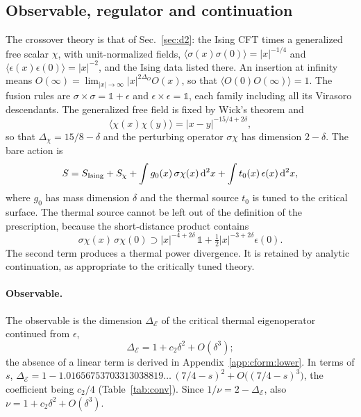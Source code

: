 \documentclass[11pt,a4paper]{article}
\numberwithin{equation}{section}
\newcommand{\dd}{\,\mathrm d}
\newcommand{\De}{\Delta_{\mathcal E}}
\begin{document}
\subsection{Observable, regulator and continuation}\label{app:cform:conv}
The crossover theory is that of Sec.~\ref{sec:d2}: the Ising CFT times a generalized free scalar $\chi$, with
unit-normalized fields, $\langle\sigma(x)\sigma(0)\rangle=|x|^{-1/4}$ and $\langle\epsilon(x)\epsilon(0)\rangle=|x|^{-2}$,
and the Ising data listed there. An insertion at infinity means
$O(\infty)=\lim_{|x|\to\infty}|x|^{2\Delta_O}O(x)$, so that $\langle O(0)O(\infty)\rangle=1$. The fusion rules are
$\sigma\times\sigma=\mathbb 1+\epsilon$ and $\epsilon\times\epsilon=\mathbb 1$, each family including all its Virasoro
descendants. The generalized free field is fixed by Wick's theorem and
\begin{equation}
 \langle\chi(x)\chi(y)\rangle=|x-y|^{-15/4+2\delta},
 \label{eq:cform:gff}
\end{equation}
so that $\Delta_\chi=15/8-\delta$ and the perturbing operator $\sigma\chi$ has dimension $2-\delta$. The bare action is
\begin{equation}
 S=S_{\rm Ising}+S_\chi+\int g_0(x)\,\sigma\chi(x)\dd^2x+\int t_0(x)\,\epsilon(x)\dd^2x,
\end{equation}
where $g_0$ has mass dimension $\delta$ and the thermal source $t_0$ is tuned to the critical surface. The thermal
source cannot be left out of the definition of the prescription, because the short-distance product contains
\begin{equation}
 \sigma\chi(x)\,\sigma\chi(0)\supset|x|^{-4+2\delta}\,\mathbb 1+\tfrac12|x|^{-3+2\delta}\epsilon(0).
\end{equation}
The second term produces a thermal power divergence. It is retained by analytic continuation, as appropriate to the
critically tuned theory.

\paragraph{Observable.} The observable is the dimension $\De$ of the critical thermal eigenoperator continued from
$\epsilon$,
\begin{equation}
 \De=1+c_2\delta^2+O(\delta^3);
\end{equation}
the absence of a linear term is derived in Appendix~\ref{app:cform:lower}. In terms of $s$,
$\De=1-1.01656753703313038819\ldots\,(7/4-s)^2+O\bigl((7/4-s)^3\bigr)$, the coefficient being $c_2/4$
(Table~\ref{tab:conv}). Since $1/\nu=2-\De$, also $\nu=1+c_2\delta^2+O(\delta^3)$.
\end{document}
